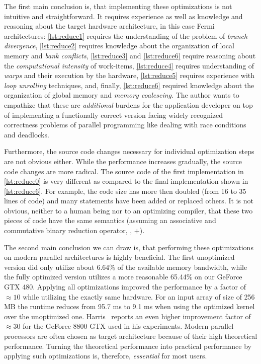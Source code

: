 The first main conclusion is, that implementing these optimizations is not intuitive and straightforward.
It requires experience as well as knowledge and reasoning about the target hardware architecture, in this case Fermi \GPU architectures:
\autoref{lst:reduce1} requires the understanding of the problem of \emph{branch divergence}, \autoref{lst:reduce2} requires knowledge about the organization of local memory and \emph{bank conflicts}, \autoref{lst:reduce3} and \autoref{lst:reduce6} require reasoning about the \emph{computational intensity} of work-items, \autoref{lst:reduce4} requires understanding of \emph{warps} and their execution by the hardware, \autoref{lst:reduce5} requires experience with \emph{loop unrolling} techniques, and, finally, \autoref{lst:reduce6} required knowledge about the organization of global memory and \emph{memory coalescing}.
The author wants to empathize that these are \emph{additional} burdens for the application developer on top of implementing a functionally correct version facing widely recognized correctness problems of parallel programming like dealing with race conditions and deadlocks.

Furthermore, the source code changes necessary for individual optimization steps are not obvious either.
While the performance increases gradually, the source code changes are more radical.
The source code of the first implementation in \autoref{lst:reduce0} is very different as compared to the final implementation shown in \autoref{lst:reduce6}.
For example, the code size has more then doubled (from 16 to 35 lines of code) and many statements have been added or replaced others.
It is not obvious, neither to a human being nor to an optimizing compiler, that these two pieces of code have the same semantics (assuming an associative and commutative binary reduction operator, \eg, $+$).

The second main conclusion we can draw is, that performing these optimizations on modern parallel architectures is highly beneficial.
The first unoptimized version did only utilize about 6.64\% of the available memory bandwidth, while the fully optimized version utilizes a more reasonable 65.44\% on our GeForce GTX 480.
Applying all optimizations improved the performance by a factor of $\approx${}$10$ while utilizing the exactly same hardware.
For an input array of size of 256 MB the runtime reduces from 95.7 ms to 9.1 ms when using the optimized kernel over the unoptimized one.
Harris~\cite{Harris2007} reports an even higher improvement factor of $\approx${}$30$ for the GeForce 8800 GTX used in his experiments.
Modern parallel processors are often chosen as target architecture because of their high theoretical performance.
Turning the theoretical performance into practical performance by applying such optimizations is, therefore, \emph{essential} for most users.





